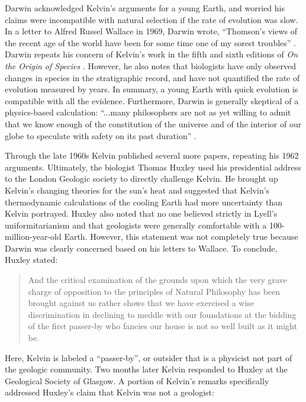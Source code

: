 \documentclass[12pt]{article}
\begin{document}
Darwin acknowledged Kelvin's arguments for a young Earth, and worried his claims were incompatible with natural selection if the rate of evolution was slow. In a letter to Alfred Russel Wallace in 1969, Darwin wrote, ``Thomson's views of the recent age of the world have been for some time one of my sorest troubles'' \citep{Marchant_1916}. Darwin repeats his concern of Kelvin's work in the fifth and sixth editions of \emph{On the Origin of Species} \citep{Darwin_1869,Darwin_1872}. However, he also notes that biologists have only observed changes in species in the stratigraphic record, and have not quantified the rate of evolution measured by years. In summary, a young Earth with quick evolution is compatible with all the evidence. Furthermore, Darwin is generally skeptical of a physics-based calculation: ``...many philosophers are not as yet willing to admit that we know enough of the constitution of the universe and of the interior of our globe to speculate with safety on its past duration'' \citep{Darwin_1872}.

Through the late 1960s Kelvin published several more papers, repeating his 1962 arguments. Ultimately, the biologist Thomas Huxley used his presidential address to the London Geologic society to directly challenge Kelvin. He brought up Kelvin's changing theories for the sun's heat and suggested that Kelvin's thermodynamic calculations of the cooling Earth had more uncertainty than Kelvin portrayed. Huxley also noted that no one believed strictly in Lyell's uniformitarianism and that geologists were generally comfortable with a 100-million-year-old Earth. However, this statement was not completely true because Darwin was clearly concerned based on his letters to Wallace. To conclude, Huxley stated: 

\begin{quote}
  And the critical examination of the grounds upon which the very grave charge of opposition to the principles of Natural Philosophy has been brought against us rather shows that we have exercised a wise discrimination in declining to meddle with our foundations at the bidding of the first passer-by who fancies our house is not so well built as it might be.
\end{quote}
Here, Kelvin is labeled a “passer-by”, or outsider that is a physicist not part of the geologic community. Two months later Kelvin responded to Huxley at the Geological Society of Glasgow. A portion of Kelvin's remarks specifically addressed Huxley's claim that Kelvin was not a geologist:
\end{document}
